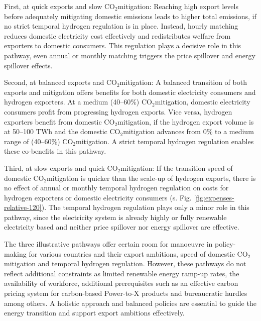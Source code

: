 \documentclass[5p,numafflabel]{elsarticle}
\newcommand{\co}{\ce{CO2}~}
\def\co{CO${}_2${\:}}
\begin{document}
First, at quick exports and slow \co mitigation: Reaching high export levels before adequately mitigating domestic emissions leads to higher total emissions, if no strict temporal hydrogen regulation is in place. Instead, hourly matching reduces domestic electricity cost effectively and redistributes welfare from exporters to domestic consumers. This regulation plays a decisive role in this pathway, even annual or monthly matching triggers the price spillover and energy spillover effects.

Second, at balanced exports and \co mitigation: A balanced transition of both exports and mitigation offers benefits for both domestic electricity consumers and hydrogen exporters. At a medium (40--60\%) \co mitigation, domestic electricity consumers profit from progressing hydrogen exports. Vice versa, hydrogen exporters benefit from domestic \co mitigation, if the hydrogen export volume is at 50--100 TWh and the domestic \co mitigation advances from 0\% to a medium range of (40--60\%) \co mitigation. A strict temporal hydrogen regulation enables these co-benefits in this pathway.

Third, at slow exports and quick \co mitigation: If the transition speed of domestic \co mitigation is quicker than the scale-up of hydrogen exports, there is no effect of annual or monthly temporal hydrogen regulation on costs for hydrogen exporters or domestic electricity consumers (s. Fig. \ref{fig:expenses-relative-120}). The temporal hydrogen regulation plays only a minor role in this pathway, since the electricity system is already highly or fully renewable electricity based and neither price spillover nor energy spillover are effective.

The three illustrative pathways offer certain room for manoeuvre in policy-making for various countries and their export ambitions, speed of domestic \co mitigation and temporal hydrogen regulation. However, these pathways do not reflect additional constraints as limited renewable energy ramp-up rates, the availability of workforce, additional prerequisites such as an effective carbon pricing system for carbon-based Power-to-X products and bureaucratic hurdles among others. 
A holistic approach and balanced policies are essential to guide the energy transition and support export ambitions effectively.
\end{document}
